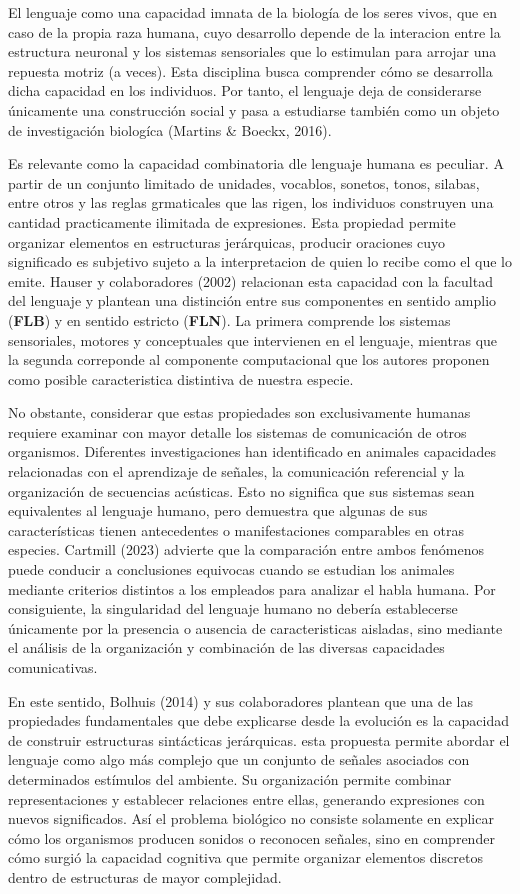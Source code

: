 \documentclass[12pt]{article}
\begin{document}
El lenguaje como una capacidad imnata de la biología de los seres vivos, que en caso de la propia raza humana, cuyo desarrollo depende de la interacion entre la estructura neuronal y los sistemas sensoriales que lo estimulan para arrojar una repuesta motriz (a veces). Esta disciplina busca comprender cómo se desarrolla dicha capacidad en los individuos. Por tanto, el lenguaje deja de considerarse únicamente una construcción social y pasa a estudiarse también como un objeto de investigación biologíca (Martins & Boeckx, 2016).

Es relevante como la capacidad combinatoria dle lenguaje humana es peculiar. A partir de un conjunto limitado de unidades, vocablos, sonetos, tonos, silabas, entre otros y las reglas grmaticales que las rigen, los individuos construyen una cantidad practicamente ilimitada de expresiones. Esta propiedad permite organizar elementos en estructuras jerárquicas, producir oraciones cuyo significado es subjetivo sujeto a la interpretacion de quien lo recibe como el que lo emite. Hauser y colaboradores (2002) relacionan esta capacidad con la facultad del lenguaje y plantean una distinción entre sus componentes en sentido amplio (\textbf{FLB}) y en sentido estricto (\textbf{FLN}). La primera comprende los sistemas sensoriales, motores y conceptuales que intervienen en el lenguaje, mientras que la segunda correponde al componente computacional que los autores proponen como posible caracteristica distintiva de nuestra especie.

No obstante, considerar que estas propiedades son exclusivamente humanas requiere examinar con mayor detalle los sistemas de comunicación de otros organismos. Diferentes investigaciones han identificado en animales capacidades relacionadas con el aprendizaje de señales, la comunicación referencial y la organización de secuencias acústicas. Esto no significa que sus sistemas sean equivalentes al lenguaje humano, pero demuestra que algunas de sus características tienen antecedentes o manifestaciones comparables en otras especies. Cartmill (2023) advierte que la comparación entre ambos fenómenos puede conducir a conclusiones equivocas cuando se estudian los animales mediante criterios distintos a los empleados para analizar el habla humana. Por consiguiente, la singularidad del lenguaje humano no debería establecerse únicamente por la presencia o ausencia de caracteristicas aisladas, sino mediante el análisis de la organización y combinación de las diversas capacidades comunicativas.

En este sentido, Bolhuis (2014) y sus colaboradores plantean que una de las propiedades fundamentales que debe explicarse desde la evolución es la capacidad de construir estructuras sintácticas jerárquicas. esta propuesta permite abordar el lenguaje como algo más complejo que un conjunto de señales asociados con determinados estímulos del ambiente. Su organización permite combinar representaciones y establecer relaciones entre ellas, generando expresiones con nuevos significados. Así el problema biológico no consiste solamente en explicar cómo los organismos producen sonidos o reconocen señales, sino en comprender cómo surgió la capacidad cognitiva que permite organizar elementos discretos dentro de estructuras de mayor complejidad.
\end{document}
